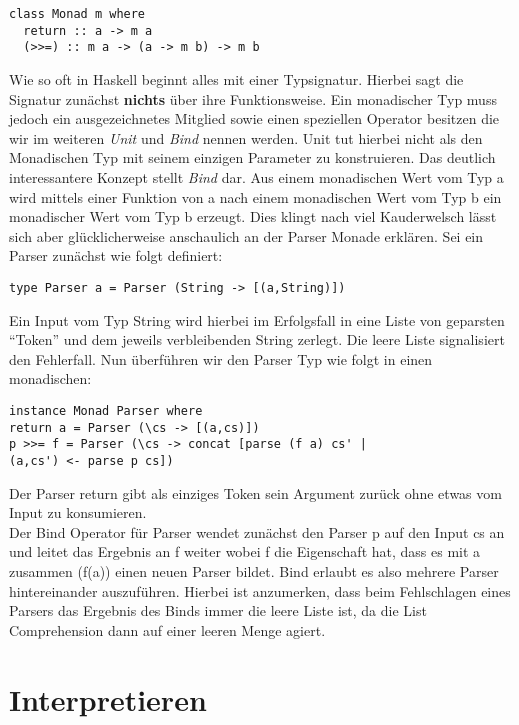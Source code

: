 \documentclass[12pt,german]{article}
\begin{document}
\begin{lstlisting}[caption=Typsignatur Monade]
class Monad m where
  return :: a -> m a
  (>>=) :: m a -> (a -> m b) -> m b
\end{lstlisting}

Wie so oft in Haskell beginnt alles mit einer Typsignatur. Hierbei
sagt die Signatur zunächst \textbf{nichts} über ihre
Funktionsweise. Ein monadischer Typ muss jedoch ein ausgezeichnetes
Mitglied sowie einen speziellen Operator
besitzen die wir im weiteren \textit{Unit} und \textit{Bind} nennen
werden. Unit tut hierbei nicht als den Monadischen Typ  mit
seinem einzigen Parameter zu konstruieren. Das deutlich interessantere
Konzept stellt \textit{Bind} dar. Aus einem monadischen Wert vom Typ a
wird mittels einer Funktion von a nach einem monadischen Wert vom Typ
b ein monadischer Wert vom Typ b erzeugt. Dies klingt nach viel
Kauderwelsch lässt sich aber glücklicherweise anschaulich an der
Parser Monade erklären.
Sei ein Parser zunächst wie folgt definiert:
\begin{lstlisting}[caption=ParserTyp]
type Parser a = Parser (String -> [(a,String)])
\end{lstlisting}
Ein Input vom Typ String wird hierbei im Erfolgsfall in eine Liste von
geparsten ``Token'' und dem jeweils verbleibenden String zerlegt. Die leere Liste
signalisiert den Fehlerfall. Nun überführen wir den Parser Typ wie
folgt in einen monadischen:
\begin{lstlisting}[caption=Monadischer Parser]
instance Monad Parser where
return a = Parser (\cs -> [(a,cs)])
p >>= f = Parser (\cs -> concat [parse (f a) cs' |
(a,cs') <- parse p cs])
\end{lstlisting}
Der Parser return gibt als einziges Token sein Argument zurück ohne etwas vom
Input zu konsumieren. \\
Der Bind Operator für Parser wendet zunächst den Parser p auf den
Input cs an und leitet das Ergebnis an f weiter wobei f die
Eigenschaft hat, dass es mit a zusammen (f(a)) einen neuen Parser
bildet. Bind erlaubt es also mehrere Parser hintereinander
auszuführen. Hierbei ist anzumerken, dass beim Fehlschlagen eines
Parsers das Ergebnis des Binds immer die leere Liste ist, da die List
Comprehension dann auf einer leeren Menge agiert.\\
\cite{GHEM}


\section{Interpretieren}
\end{document}
